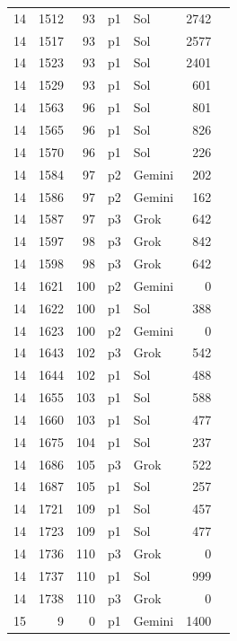 \begin{longtable}{r r r l l r L{2.2in}}
14 & 1512 & 93 & p1 & Sol & 2742 &  \\
14 & 1517 & 93 & p1 & Sol & 2577 &  \\
14 & 1523 & 93 & p1 & Sol & 2401 &  \\
14 & 1529 & 93 & p1 & Sol & 601 &  \\
14 & 1563 & 96 & p1 & Sol & 801 &  \\
14 & 1565 & 96 & p1 & Sol & 826 &  \\
14 & 1570 & 96 & p1 & Sol & 226 &  \\
14 & 1584 & 97 & p2 & Gemini & 202 &  \\
14 & 1586 & 97 & p2 & Gemini & 162 &  \\
14 & 1587 & 97 & p3 & Grok & 642 &  \\
14 & 1597 & 98 & p3 & Grok & 842 &  \\
14 & 1598 & 98 & p3 & Grok & 642 &  \\
14 & 1621 & 100 & p2 & Gemini & 0 &  \\
14 & 1622 & 100 & p1 & Sol & 388 &  \\
14 & 1623 & 100 & p2 & Gemini & 0 &  \\
14 & 1643 & 102 & p3 & Grok & 542 &  \\
14 & 1644 & 102 & p1 & Sol & 488 &  \\
14 & 1655 & 103 & p1 & Sol & 588 &  \\
14 & 1660 & 103 & p1 & Sol & 477 &  \\
14 & 1675 & 104 & p1 & Sol & 237 &  \\
14 & 1686 & 105 & p3 & Grok & 522 &  \\
14 & 1687 & 105 & p1 & Sol & 257 &  \\
14 & 1721 & 109 & p1 & Sol & 457 &  \\
14 & 1723 & 109 & p1 & Sol & 477 &  \\
14 & 1736 & 110 & p3 & Grok & 0 &  \\
14 & 1737 & 110 & p1 & Sol & 999 &  \\
14 & 1738 & 110 & p3 & Grok & 0 &  \\
15 & 9 & 0 & p1 & Gemini & 1400 &  \\

\end{longtable}
